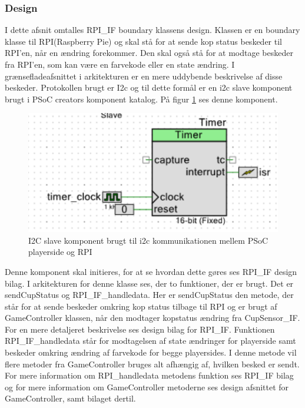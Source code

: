 \documentclass[Rapport/Playerside/RPI_IF/RPI_IF.tex]{subfiles}
\begin{document}
\subsubsection{Design}
I dette afsnit omtalles RPI\_IF boundary klassens design. Klassen er en boundary klasse til RPI(Raspberry Pie) og skal stå for at sende kop status beskeder til RPI'en, når en ændring forekommer. Den skal også stå for at modtage beskeder fra RPI'en, som kan være en farvekode eller en state ændring. I grænsefladeafsnittet i arkitekturen er en mere uddybende beskrivelse af disse beskeder. Protokollen brugt er I2c og til dette formål er en i2c slave komponent brugt i PSoC creators komponent katalog. På figur \ref{fig:I2c_slave} ses denne komponent.
\begin{figure}
    \centering 
    \includegraphics[width=\linewidth]{Softwaredesign/GameController/graphic/gamecontroller_timer.PNG}
    \caption{I2C slave komponent brugt til i2c kommunikationen mellem PSoC playerside og RPI}
    \label{fig:I2c_slave}
\end{figure}
Denne komponent skal initieres, for at se hvordan dette gøres ses RPI\_IF design bilag. I arkitekturen for denne klasse ses, der to funktioner, der er brugt. Det er sendCupStatus og RPI\_IF\_handledata. Her er sendCupStatus den metode, der står for at sende beskeder omkring kop status tilbage til RPI og er brugt af GameController klassen, når den modtager kopstatus ændring fra CupSensor\_IF. For en mere detaljeret beskrivelse ses design bilag for RPI\_IF. Funktionen  RPI\_IF\_handledata står for modtagelsen af state ændringer for playerside samt beskeder omkring ændring af farvekode for begge playersides. I denne metode vil flere metoder fra GameController bruges alt afhængig af, hvilken besked er sendt. For mere information om RPI\_handledata metodens funktion ses RPI\_IF bilag og for mere information om GameController metoderne ses design afsnittet for GameController, samt bilaget dertil.
\end{document}
